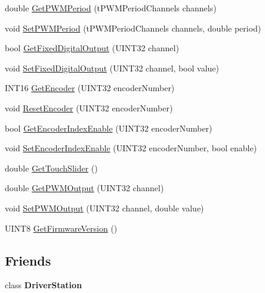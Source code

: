 \begin{DoxyCompactItemize}
\item 
double \hyperlink{classDriverStationEnhancedIO_a4cd8909d9a276724787ea5ec0f954c66}{\-Get\-P\-W\-M\-Period} (t\-P\-W\-M\-Period\-Channels channels)
\item 
void \hyperlink{classDriverStationEnhancedIO_a6f1c7196f6cbcce00a928d7380b9d46f}{\-Set\-P\-W\-M\-Period} (t\-P\-W\-M\-Period\-Channels channels, double period)
\item 
bool \hyperlink{classDriverStationEnhancedIO_aee619374b9c5f1135682bda584ec146c}{\-Get\-Fixed\-Digital\-Output} (\-U\-I\-N\-T32 channel)
\item 
void \hyperlink{classDriverStationEnhancedIO_a97ef0ba03c428cb102d7a8687e482f17}{\-Set\-Fixed\-Digital\-Output} (\-U\-I\-N\-T32 channel, bool value)
\item 
\-I\-N\-T16 \hyperlink{classDriverStationEnhancedIO_a32f6f8d6b4f5969ea4f85373d5e0f1b7}{\-Get\-Encoder} (\-U\-I\-N\-T32 encoder\-Number)
\item 
void \hyperlink{classDriverStationEnhancedIO_a22ca90b78c4412be888953c77f6280e6}{\-Reset\-Encoder} (\-U\-I\-N\-T32 encoder\-Number)
\item 
bool \hyperlink{classDriverStationEnhancedIO_a6e88a899d3cdb6e4750d37204e269f9c}{\-Get\-Encoder\-Index\-Enable} (\-U\-I\-N\-T32 encoder\-Number)
\item 
void \hyperlink{classDriverStationEnhancedIO_a01d34032c4d8c282359c62c3b44f8a85}{\-Set\-Encoder\-Index\-Enable} (\-U\-I\-N\-T32 encoder\-Number, bool enable)
\item 
double \hyperlink{classDriverStationEnhancedIO_a873a93d533fc36508b0315796319fd90}{\-Get\-Touch\-Slider} ()
\item 
double \hyperlink{classDriverStationEnhancedIO_ae98d30680867528616fee53ff90b6921}{\-Get\-P\-W\-M\-Output} (\-U\-I\-N\-T32 channel)
\item 
void \hyperlink{classDriverStationEnhancedIO_aa343765022e453e9be07719b3e247eb5}{\-Set\-P\-W\-M\-Output} (\-U\-I\-N\-T32 channel, double value)
\item 
\-U\-I\-N\-T8 \hyperlink{classDriverStationEnhancedIO_af47e837e7e54536ea38e141a38192c9f}{\-Get\-Firmware\-Version} ()
\end{DoxyCompactItemize}
\subsection*{\-Friends}
\begin{DoxyCompactItemize}
\item 
\hypertarget{classDriverStationEnhancedIO_a8a49b196fd9fe998c84a7bee5ebe1883}{class {\bfseries \-Driver\-Station}}\label{classDriverStationEnhancedIO_a8a49b196fd9fe998c84a7bee5ebe1883}

\end{DoxyCompactItemize}


